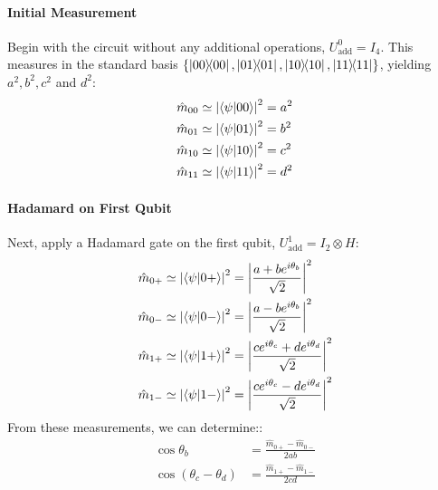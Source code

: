 \documentclass[a4paper, 11pt]{article}
\begin{document}
\paragraph{Initial Measurement}
Begin with the circuit without any additional operations, $U_{\text{add}}^{0}=I_4$. 
This measures in the standard basis $\left\{ \ketbra{00}, \ketbra{01}, \ketbra{10}, \ketbra{11} \right\}$, yielding $a^2 , b^2 , c^2$ and $d^2$:
\begin{align}
  \hat{m}_{00} &\simeq \left| \bra{\psi}\ket{00} \right|^2 = a^2 \\ 
  \hat{m}_{01} &\simeq \left| \bra{\psi}\ket{01} \right|^2 = b^2 \\ 
  \hat{m}_{10} &\simeq \left| \bra{\psi}\ket{10} \right|^2 = c^2 \\ 
  \hat{m}_{11} &\simeq \left| \bra{\psi}\ket{11} \right|^2 = d^2  
\end{align}
\paragraph{Hadamard on First Qubit}
Next, apply a Hadamard gate on the first qubit, $U_{\text{add}}^{1} = I_2 \otimes H$:
\begin{align}
  \hat{m}_{0+} &\simeq \left| \bra{\psi}\ket{0+} \right|^2 = \left| \frac{a+b e^{i\theta_b}}{\sqrt{2}}\right|^2 \\ 
  \hat{m}_{0-} &\simeq \left| \bra{\psi}\ket{0-} \right|^2 = \left| \frac{a-b e^{i\theta_b}}{\sqrt{2}}\right|^2 \\ 
  \hat{m}_{1+} &\simeq \left| \bra{\psi}\ket{1+} \right|^2 = \left| \frac{c e^{i\theta_c}+d e^{i\theta_d}}{\sqrt{2}}\right|^2  \\ 
  \hat{m}_{1-} &\simeq \left| \bra{\psi}\ket{1-} \right|^2 = \left| \frac{c e^{i\theta_c}-d e^{i\theta_d}}{\sqrt{2}}\right|^2
\end{align}
From these measurements, we can determine::
\begin{align}
  \cos\theta_{b} &= \frac{\hat{m}_{0+} - \hat{m}_{0-}}{2ab} \label{eq:TwoQubitQST1} \\
  \cos(\theta_{c} - \theta_{d}) &= \frac{\hat{m}_{1+} - \hat{m}_{1-}}{2cd} \label{eq:TwoQubitQST2} \\
\end{align}
\end{document}
